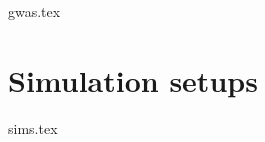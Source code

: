 
\section{}\label{sec:PT:gwas}
    {{gwas.tex}}


\section{Simulation setups}\label{sec:PT:sims}
    {{sims.tex}}





        


